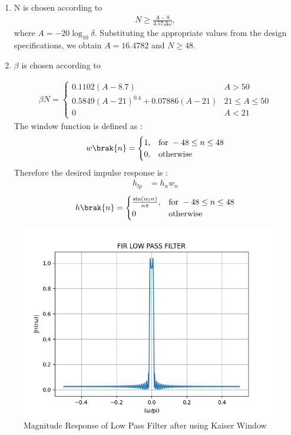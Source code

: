 \documentclass{article}
\begin{document}
\begin{enumerate}
\item  N is chosen according to
\begin{align}
    N \geq \frac{A-8}{4.57\Delta \omega},
\end{align}
where $A = -20\log_{10}\delta$.  Substituting the appropriate values from the design specifications, we obtain
$A = 16.4782$ and $N \geq 48$.


\item  $\beta$ is chosen according to

\begin{align}
    \beta N = \left\{ \begin{array}{ll} 0.1102(A-8.7) & A > 50 \\
0.5849(A-21)^{0.4}+ 0.07886(A-21) & 21 \leq A \leq 50 \\
0 & A < 21\end{array} \right.
\end{align}
The window function is defined as :
\begin{align}
    w\brak{n} = 
\begin{cases} 
    1, & \text{for } -48\leq n \leq 48 \\
    0, & \text{otherwise } 
\end{cases} \label{eq:w(n)_for_Kaiser}
\end{align}
Therefore the desired impulse response is :
\begin{align}
    h_{lp} &= h_{n}w_{n}
\end{align}
\begin{align}
    h\brak{n} = 
\begin{cases} 
    \frac{\sin(w_l n)}{n\pi},  & \text{for } -48\leq n \leq 48 \\
    0 &\text{otherwise}
\end{cases} \label{eq:h(n)desired_for_LPF}
\end{align}
\end{enumerate}
\begin{figure}[H]
\centering
\includegraphics[width=1\columnwidth]{figs/FIR_Low_Filter.png}
\caption{Magnitude Response of Low Pass Filter after using Kaiser Window}
\label{fig:Kaiser_LPF_response}
\end{figure}
\end{document}
